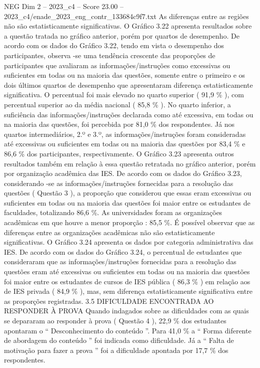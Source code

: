 \begin{textsample}{NEG Dim 2 – 2023\_c4 – Score 23.00 – 2023\_c4/enade\_2023\_eng\_contr\_133684c9f7.txt}
As diferenças entre as regiões não são estatisticamente significativas.
O Gráfico 3.22 apresenta resultados sobre a questão tratada no gráfico anterior, porém por quartos de desempenho.
De acordo com os dados do Gráfico 3.22, tendo em vista o desempenho dos participantes, observa -se uma tendência crescente das proporções de participantes que avaliaram as informações/instruções como excessivas ou suficientes em todas ou na maioria das questões, somente entre o primeiro e os dois últimos quartos de desempenho que apresentaram diferença estatisticamente significativa.
O percentual foi mais elevado no quarto superior ( 91,9 \% ), com percentual superior ao da média nacional ( 85,8 \% ).
No quarto inferior, a suficiência das informações/instruções declarada como até excessiva, em todas ou na maioria das questões, foi percebida por 81,0 \% dos respondentes.
Já nos quartos intermediários, 2.º e 3.º, as informações/instruções foram consideradas até excessivas ou suficientes em todas ou na maioria das questões por 83,4 \% e 86,6 \% dos participantes, respectivamente.
O Gráfico 3.23 apresenta outros resultados também em relação à essa questão retratada no gráfico anterior, porém por organização acadêmica das IES.
De acordo com os dados do Gráfico 3.23, considerando -se as informações/instruções fornecidas para a resolução das questões ( Questão 3 ), a proporção que considerou que essas eram excessivas ou suficientes em todas ou na maioria das questões foi maior entre os estudantes de faculdades, totalizando 86,6 \%.
As universidades foram as organizações acadêmicas em que houve a menor proporção : 85,5 \%.
É possível observar que as diferenças entre as organizações acadêmicas não são estatisticamente significativas.
O Gráfico 3.24 apresenta os dados por categoria administrativa das IES.
De acordo com os dados do Gráfico 3.24, o percentual de estudantes que consideraram que as informações/instruções fornecidas para a resolução das questões eram até excessivas ou suficientes em todas ou na maioria das questões foi maior entre os estudantes de cursos de IES pública ( 86,3 \% ) em relação aos de IES privada ( 84,9 \% ), mas, sem diferença estatisticamente significativa entre as proporções registradas. 3.5 DIFICULDADE ENCONTRADA AO RESPONDER À PROVA Quando indagados sobre as dificuldades com as quais se depararam ao responder à prova ( Questão 4 ), 22,9 \% dos estudantes apontaram o “ Desconhecimento do conteúdo ”.
Para 41,0 \% a “ Forma diferente de abordagem do conteúdo ” foi indicada como dificuldade.
Já a “ Falta de motivação para fazer a prova ” foi a dificuldade apontada por 17,7 \% dos respondentes.

\end{textsample}
